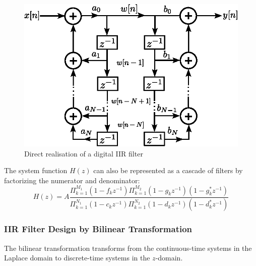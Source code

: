 \begin{figure}[H]
    \centering
    \includegraphics{images/IIR_filter.eps}
    \caption{Direct realisation of a digital IIR filter}
    \label{fig:IIR_direct}
\end{figure}


The system function $H(z)$ can also be represented as a cascade of filters by factorizing the numerator and denominator:
\[
    H(z) = A \frac{\Pi_{k=1}^{M_1}(1-f_{k}z^{-1}) \Pi_{k=1}^{M_2}(1-g_{k}z^{-1})(1-g_{k}^{*}z^{-1})}{\Pi_{k=1}^{N_1}(1-c_{k}z^{-1}) \Pi_{k=1}^{N_2}(1-d_{k}z^{-1})(1-d_{k}^{*}z^{-1})}
\]


\subsubsection{IIR Filter Design by Bilinear Transformation}
The bilinear transformation transforms from the continuous-time systems in the Laplace domain to discrete-time systems in the $z$-domain. \\

